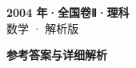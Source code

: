 \documentclass[zihao=-4, a4paper]{ctexart}
\begin{document}
\begin{center}
  {\Large\bfseries 2004 年·全国卷Ⅱ·理科}\\[4pt]
  {\large 数学 · 解析版}
\end{center}
\medskip
{}

\clearpage
{}
\begin{center}{\Large\bfseries 参考答案与详细解析}\end{center}
\medskip

\end{document}
